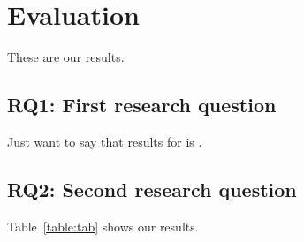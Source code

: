 \section{Evaluation}
\label{sec:eval}

These are our results.

\subsection{RQ1: First research question}
\label{sec:eval:rq1}

Just want to say that results for  is
.

\subsection{RQ2: Second research question}
\label{sec:eval:rq2}



Table~\ref{table:tab} shows our results.
